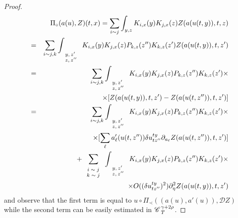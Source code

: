 \documentclass{amsart}
\newcommand{\tmscript}[1]{\text{\scriptsize{$#1$}}}
\theoremstyle{remark}
\theoremstyle{definition}
\newcommand{\CC}{\mathscr{C} \hspace{.1em}}
\begin{document}
\begin{proof}
  
  \begin{eqnarray*}
    &  & \Pi_{\circ} (a (u), Z) (t, x) = \sum_{i \sim j} \int_{y, z} K_{i, x}
    (y) K_{j, x} (z) Z (a (u (t, y)), t, z)\\
    & = & \sum_{i \sim j, k} \int_{\tmscript{_{\tmscript{\begin{array}{l}
      y, z'\\
      z, z''
    \end{array}}}}} K_{i, x} (y) K_{j, x} (z) P_{k, z} (z'') K_{k, z} (z') Z
    (a (u (t, y)), t, z')\\
    & = & \sum_{i \sim j, k} \int_{\tmscript{_{\tmscript{\begin{array}{l}
      y, z'\\
      z, z''
    \end{array}}}}} K_{i, x} (y) K_{j, x} (z) P_{k, z} (z'') K_{k, z} (z')
    \times\\
    &  & \times [Z (a (u (t, y)), t, z') - Z (a (u (t, z'')), t, z')]\\
    & = & \sum_{i \sim j, k} \int_{\tmscript{_{\tmscript{\begin{array}{l}
      y, z'\\
      z, z''
    \end{array}}}}} K_{i, x} (y) K_{j, x} (z) P_{k, z} (z'') K_{k, z} (z')
    \times\\
    &  & \times [\sum_{\ell} a'_{\ell} (u (t, z'')) \delta u^{t y}_{t z''}
    \partial_{a_{\ell}} Z (a (u (t, z'')), t, z')]\\
    &  & + \sum_{\tmscript{_{\tmscript{\begin{array}{c}
      i \sim j\\
      k \sim j
    \end{array}}}}} \int_{\tmscript{_{\tmscript{\begin{array}{l}
      y, z'\\
      z, z''
    \end{array}}}}} K_{i, x} (y) K_{j, x} (z) P_{k, z} (z'') K_{k, z} (z')
    \times\\
    &  & \times O ((\delta u^{t y}_{t z''})^2) \partial_{\eta}^2 Z (a (u (t,
    y)), t, z')
  \end{eqnarray*}
  and observe that the first term is equal to $u \circ \Pi_{\prec} ((a (u), a'
  (u)), \mathcal{D}Z)$ while the second term can be easily estimated in
  $\CC_T^{\gamma + 2 \rho}$. 
\end{proof}
\end{document}
